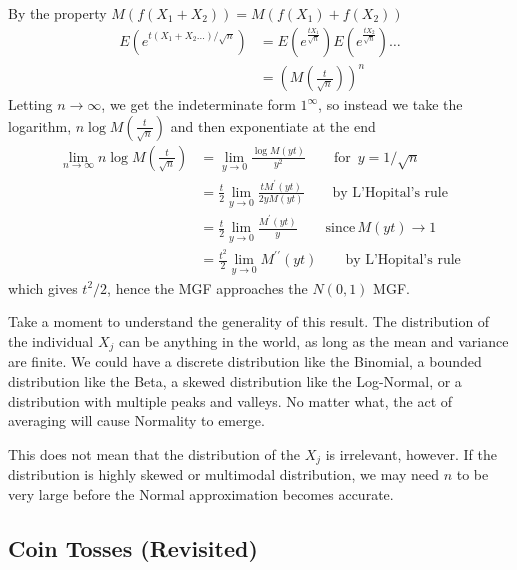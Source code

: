 \documentclass[11pt,a4paper]{article}
\begin{document}
By the property
\(M\left( f\left( X_{1} + X_{2} \right) \right) = M(f\left( X_{1} \right) + f\left( X_{2} \right))\)
\begin{equation}
\begin{split}
E\left( e^{t(X_{1} + X_{2}\ldots)/\sqrt{n}} \right) &= 
E\left( e^{\frac{tX_{1}}{\sqrt{n}}} \right)E\left( e^{\frac{tX_{2}}{\sqrt{n}}} \right)\ldots \\
&= \left( M\left( \frac{t}{\sqrt{n}} \right) \right)^{n}
\end{split}
\end{equation}
Letting \(n \rightarrow \infty\), 
we get the indeterminate form \(1^{\infty}\), 
so instead we take the logarithm,
\(n\log{M\left(\frac{t}{\sqrt{n}}\right)}\) and then exponentiate at the end
\begin{equation}
\begin{split}
\lim_{n \rightarrow \infty}{n\log{M\left( \frac{t}{\sqrt{n}} \right)}} &= 
\lim_{y \rightarrow 0}\frac{\log{M(yt)}}{y^{2}}\qquad \text{for}\,\,\,y = 1/\sqrt{n} \\
&= \frac{t}{2}\lim_{y \rightarrow 0}\frac{tM^{\prime}(yt)}{2yM(yt)}\qquad\text{by L'Hopital's rule}\\&= 
\frac{t}{2}\lim_{y \rightarrow 0}\frac{M^{\prime}(yt)}{y}\qquad \text{since}\,M(yt) \rightarrow 1\\
&= \frac{t^{2}}{2}\lim_{y \rightarrow 0}{M^{\prime\prime}(yt)}\qquad \text{by L'Hopital's rule}
\end{split}
\end{equation}
which gives \(t^{2}/2\), 
hence the MGF approaches the \(N(0,1)\) MGF.

Take a moment to understand the generality of this result. 
The distribution of the individual \(X_{j}\) can be anything in the world,
as long as the mean and variance are finite. 
We could have a discrete distribution like the Binomial, 
a bounded distribution like the Beta, 
a skewed distribution like the Log-Normal, 
or a distribution with multiple peaks and valleys. 
No matter what, 
the act of averaging will cause Normality to emerge.

This does not mean that the distribution of the \(X_{j}\) is irrelevant, 
however. 
If the distribution is highly skewed or multimodal distribution, 
we may need \(n\) to be very large before the Normal approximation becomes accurate.

\subsection{Coin Tosses (Revisited)}
\end{document}
